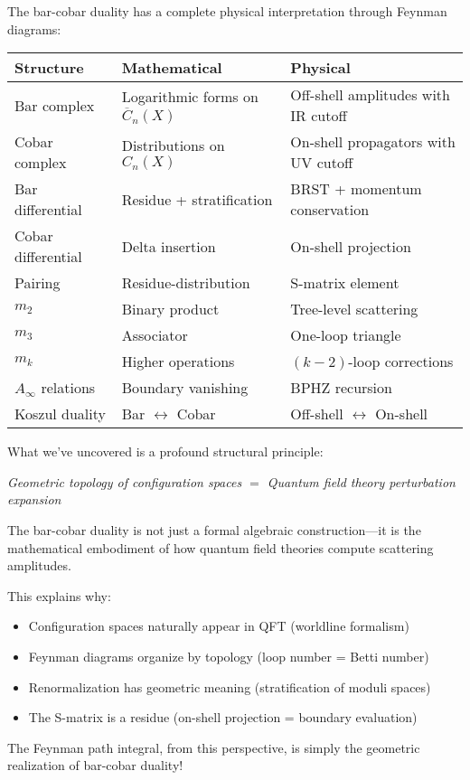 \begin{remark}[Summary]
The bar-cobar duality has a complete physical interpretation through Feynman 
diagrams:

\begin{center}
\begin{tabular}{|l|p{5cm}|p{5cm}|}
\hline
\textbf{Structure} & \textbf{Mathematical} & \textbf{Physical} \\
\hline
Bar complex & Logarithmic forms on $\overline{C}_n(X)$ & Off-shell amplitudes 
with IR cutoff \\
\hline
Cobar complex & Distributions on $C_n(X)$ & On-shell propagators with UV cutoff \\
\hline
Bar differential & Residue + stratification & BRST + momentum conservation \\
\hline
Cobar differential & Delta insertion & On-shell projection \\
\hline
Pairing & Residue-distribution & S-matrix element \\
\hline
$m_2$ & Binary product & Tree-level scattering \\
\hline
$m_3$ & Associator & One-loop triangle \\
\hline
$m_k$ & Higher operations & $(k-2)$-loop corrections \\
\hline
$A_\infty$ relations & Boundary vanishing & BPHZ recursion \\
\hline
Koszul duality & Bar $\leftrightarrow$ Cobar & Off-shell $\leftrightarrow$ On-shell \\
\hline
\end{tabular}
\end{center}
\end{remark}

\begin{remark}
What we've uncovered is a profound structural principle:

\begin{center}
\textit{Geometric topology of configuration spaces $=$ Quantum field theory 
perturbation expansion}
\end{center}

The bar-cobar duality is not just a formal algebraic construction—it is the 
mathematical embodiment of how quantum field theories compute scattering amplitudes.

This explains why:
\begin{itemize}
\item Configuration spaces naturally appear in QFT (worldline formalism)
\item Feynman diagrams organize by topology (loop number = Betti number)
\item Renormalization has geometric meaning (stratification of moduli spaces)
\item The S-matrix is a residue (on-shell projection = boundary evaluation)
\end{itemize}

The Feynman path integral, from this perspective, is simply the geometric 
realization of bar-cobar duality!
\end{remark}


